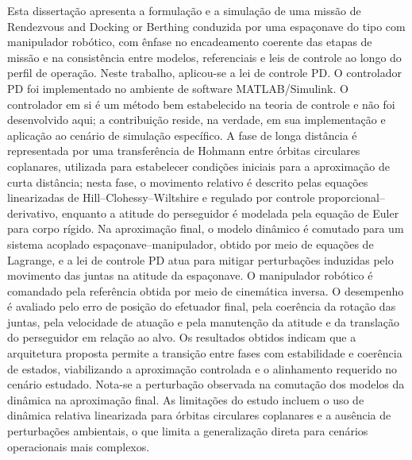 Esta dissertação apresenta a formulação e a simulação de uma missão de Rendezvous and Docking or Berthing conduzida por uma espaçonave do tipo com manipulador robótico, com ênfase no encadeamento coerente das etapas de missão e na consistência entre modelos, referenciais e leis de controle ao longo do perfil de operação. Neste trabalho, aplicou-se a lei de controle PD. O controlador PD foi implementado no ambiente de software MATLAB/Simulink. O controlador em si é um método bem estabelecido na teoria de controle e não foi desenvolvido aqui; a contribuição reside, na verdade, em sua implementação e aplicação ao cenário de simulação específico. A fase de longa distância é representada por uma transferência de Hohmann entre órbitas circulares coplanares, utilizada para estabelecer condições iniciais para a aproximação de curta distância; nesta fase, o movimento relativo é descrito pelas equações linearizadas de Hill--Clohessy--Wiltshire e regulado por controle proporcional--derivativo, enquanto a atitude do perseguidor é modelada pela equação de Euler para corpo rígido. Na aproximação final, o modelo dinâmico é comutado para um sistema acoplado espaçonave--manipulador, obtido por meio de equações de Lagrange, e a lei de controle PD atua para mitigar perturbações induzidas pelo movimento das juntas na atitude da espaçonave. O manipulador robótico é comandado pela referência obtida por meio de cinemática inversa. O desempenho é avaliado pelo erro de posição do efetuador final, pela coerência da rotação das juntas, pela velocidade de atuação e pela manutenção da atitude e da translação do perseguidor em relação ao alvo. Os resultados obtidos indicam que a arquitetura proposta permite a transição entre fases com estabilidade e coerência de estados, viabilizando a aproximação controlada e o alinhamento requerido no cenário estudado. Nota-se a perturbação observada na comutação dos modelos da dinâmica na aproximação final. As limitações do estudo incluem o uso de dinâmica relativa linearizada para órbitas circulares coplanares e a ausência de perturbações ambientais, o que limita a generalização direta para cenários operacionais mais complexos.